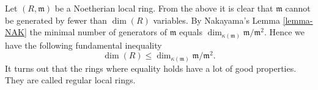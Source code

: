 Let $(R, \mathfrak m)$ be a Noetherian local ring.
From the above it is clear that $\mathfrak m$ cannot be
generated by fewer than $\dim(R)$ variables.
By Nakayama's Lemma \ref{lemma-NAK} the minimal number
of generators of $\mathfrak m$ equals $\dim_{\kappa(\mathfrak m)}
\mathfrak m/\mathfrak m^2$. Hence we have the following
fundamental inequality
$$
\dim(R) \leq \dim_{\kappa(\mathfrak m)} \mathfrak m/\mathfrak m^2.
$$
It turns out that the rings where equality holds
have a lot of good properties. They are called
regular local rings.

